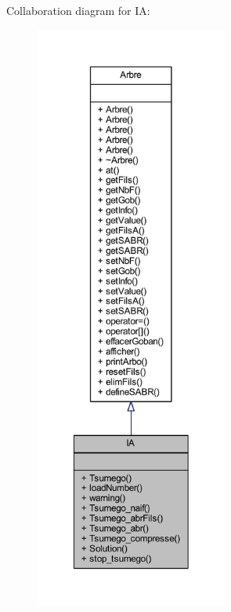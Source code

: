 Collaboration diagram for IA\+:
\nopagebreak
\begin{figure}[H]
\begin{center}
\leavevmode
\includegraphics[height=550pt]{class_i_a__coll__graph}
\end{center}
\end{figure}
